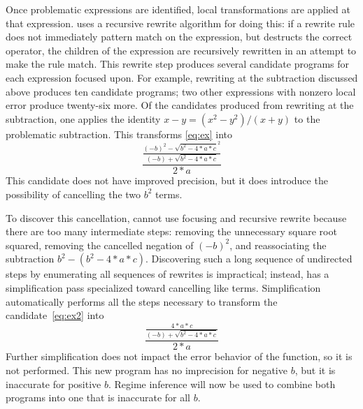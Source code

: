 \documentclass[paper.tex]{subfiles}
\begin{document}
Once problematic expressions are identified, local transformations are
applied at that expression.  \casio uses a recursive rewrite algorithm
for doing this: if a rewrite rule does not immediately pattern match
on the expression, but destructs the correct operator, the children of
the expression are recursively rewritten in an attempt to make the
rule match.  This rewrite step produces several candidate programs for
each expression focused upon.  For example, rewriting at the
subtraction discussed above produces ten candidate programs; two other
expressions with nonzero local error produce twenty-six more.  Of the
candidates produced from rewriting at the subtraction, one applies the
identity $x - y = (x^2 - y^2) / (x + y)$ to the problematic
subtraction.  This transforms \eqref{eq:ex} into
\begin{equation} \label{eq:ex2}
  \frac{\frac{(-b)^2 - \sqrt{b^2 - 4*a*c}^2}
             {(-b) + \sqrt{b^2 - 4*a*c}}}
       {2 * a}
\end{equation}
This candidate does not have improved precision, but it does introduce
the possibility of cancelling the two $b^2$ terms.

To discover this cancellation, \casio cannot use focusing and
recursive rewrite because there are too many intermediate steps:
removing the unnecessary square root squared, removing the cancelled
negation of $(-b)^2$, and reassociating the subtraction $b^2 - (b^2 -
4*a*c)$.  Discovering such a long sequence of undirected steps by
enumerating all sequences of rewrites is impractical; instead, \casio
has a simplification pass specialized toward cancelling like terms.
Simplification automatically performs all the steps necessary to
transform the candidate~\eqref{eq:ex2} into
\begin{equation} \label{eq:ex3}
  \frac{\frac{4*a*c}
             {(-b) + \sqrt{b^2 - 4*a*c}}}
       {2*a}
\end{equation}
Further simplification does not impact the error behavior of the
function, so it is not performed.  This new program has no imprecision
for negative $b$, but it is inaccurate for positive $b$.  Regime
inference will now be used to combine both programs into one that is
inaccurate for all $b$.
\end{document}
